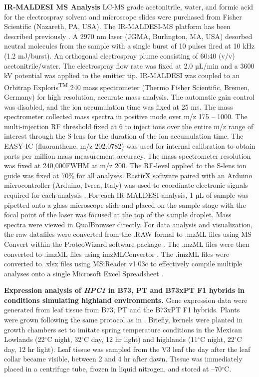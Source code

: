 \documentclass[9pt,twocolumn,twoside,lineno]{biorxiv}
\begin{document}
\textbf{IR-MALDESI MS Analysis}
LC-MS grade acetonitrile, water, and formic acid for the electrospray solvent and microscope slides were purchased from Fisher Scientific (Nazareth, PA, USA). 
The IR-MALDESI-MS platform has been described previously \cite{Caleb_Bagley2021-eh, Bokhart2016-he}. 
A 2970 nm laser (JGMA, Burlington, MA, USA) desorbed neutral molecules from the sample with a single burst of 10 pulses fired at 10 kHz (1.2 mJ/burst). 
An orthogonal electrospray plume consisting of 60:40 (v/v) acetonitrile/water. 
The electrospray flow rate was fixed at 2.0 µL/min and a 3600 kV potential was applied to the emitter tip. 
IR-MALDESI was coupled to an Orbitrap Exploris\textsuperscript{TM} 240 mass spectrometer (Thermo Fisher Scientific, Bremen, Germany) for high resolution, accurate mass analysis. 
The automatic gain control was disabled, and the ion accumulation time was fixed at 25 ms. 
The mass spectrometer collected mass spectra in positive mode over m/z 175 – 1000. 
The multi-injection RF threshold fixed at 6 to inject ions over the entire m/z range of interest through the S-lens for the duration of the ion accumulation time. 
The EASY-IC (fluoranthene, m/z 202.0782) was used for internal calibration to obtain parts per million mass measurement accuracy. 
The mass spectrometer resolution was fixed at 240,000FWHM at m/z 200. The RF-level applied to the S-lens ion guide was fixed at 70\% for all analyses. 
RastirX software paired with an Arduino microcontroller (Arduino, Ivrea, Italy) was used to coordinate electronic signals required for each analysis \cite{Garrard2020-nt}. 
For each IR-MALDESI analysis, 1 µL of sample was pipetted onto a glass microscope slide and placed on the sample stage with the focal point of the laser was focused at the top of the sample droplet.
Mass spectra were viewed in QualBrowser directly. 
For data analysis and visualization, the raw datafiles were converted from the .RAW formal to .mzML files using MS Convert within the ProteoWizard software package \cite{Chambers2012-da}. 
The .mzML files were then converted to .imzML files using imzMLConvertor \cite{Race2012-wl}. 
The .imzML files were converted to .xlsx files using MSiReader v1.03c to effectively compile multiple analyses onto a single Microsoft Excel Spreadsheet \cite{Robichaud2013-ao, Bokhart2018-hs}.

\textbf{Expression analysis of \textit{HPC1} in B73, PT and B73xPT F1 hybrids in conditions simulating highland environments.}
Gene expression data were generated from leaf tissue from B73, PT and the B73xPT F1 hybrids. 
Plants were grown following the same protocol as in \cite{Crow2020-gene}.
Briefly, kernels were planted in growth chambers set to imitate spring temperature conditions in the Mexican Lowlands (22$^{\circ}$C night, 32$^{\circ}$C day, 12 hr light) and highlands (11$^{\circ}$C night, 22$^{\circ}$C day, 12 hr light). 
Leaf tissue was sampled from the V3 leaf the day after the leaf collar became visible, between 2 and 4 hr after dawn. 
Tissue was immediately placed in a centrifuge tube, frozen in liquid nitrogen, and stored at --70$^{\circ}$C.
\end{document}
